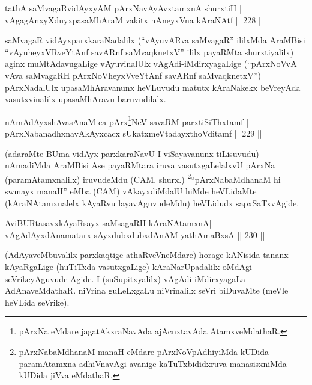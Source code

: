 
\begin{shl}
tathA saMvagaRvidAyxyAM pArxNavAyAvxtamxnA shurxtiH |\\
vAgagAnxyXduyxpasaMhAraM vakitx nAneyxVna kAraNAtf \hfill || 228 ||
\end{shl}

\begin{artha}
saMvagaR vidAyxparxkaraNadalilx (``vAyuvARva saMvagaR'' ililxMda AraMBisi ``vAyuheyxVRveYtAnf savARnf saMvaqknetxV'' ililx payaRMta shurxtiyalilx) aginx muMtAdavugaLige vAyuvinalUlx vAgAdi-iMdirxyagaLige (``pArxNoVvA vAva saMvagaRH pArxNoVheyxVveYtAnf savARnf saMvaqknetxV'') pArxNadalUlx upasaMhAravanunx heVLuvudu matutx kAraNakekx beVreyAda vasutxvinalilx upasaMhAravu baruvudilalx.
\end{artha}


\begin{shl}
nAmAdAyxshAvasAnaM ca pArx\footnote{pArxNa eMdare jagatAkxraNavAda ajAcnxtavAda AtamxveMdathaR.}NeV savaRM parxtiSiThxtamf |\\
pArxNabanadhxnavAkAyxcacx sUkatxmeVtadayxthoVditamf \hfill || 229 ||
\end{shl}

\begin{artha}
(adaraMte BUma vidAyx parxkaraNavU I viSayavanunx tiLisuvudu) nAmadiMda AraMBisi Ase payaRMtara iruva vasutxgaLelalxvU pArxNa (paramAtamxnalilx) iruvudeMdu (CAM. shurx.) \footnote{pArxNabaMdhanaM manaH eMdare pArxNoVpAdhiyiMda kUDida paramAtamxna adhiVnavAgi avanige kaTuTxbididxruva manasisxniMda kUDida jiVva eMdathaR.}``pArxNabaMdhanaM hi swmayx manaH'' eMba (CAM) vAkayxdiMdalU hiMde heVLidaMte (kAraNAtamxnalelx kAyaRvu layavAguvudeMdu) heVLidudx sapxSaTxvAgide.
\end{artha}

\begin{shl}
AviBURtasavxkAyaRsayx saMsagaRH kAraNAtamxnA|\\
vAgAdAyxdAnamatarx sAyxdubxdubxdAnAM yathA\s maBxsA \hfill || 230 ||
\end{shl}

\begin{artha}
(AdAyaveMbuvalilx parxkaqtige athaRveVneMdare) horage kANisida tananx kAyaRgaLige (huTiTxda vasutxgaLige) kAraNarUpadalilx oMdAgi seVrikeyAguvude Agide. I (suSupitxyalilx) vAgAdi iMdirxyagaLa AdAnaveMdathaR. niVrina guLeLxgaLu niVrinalilx seVri biDuvaMte (meVle heVLida seVrike).
\end{artha}

